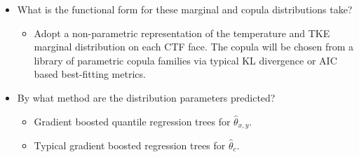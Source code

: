 \documentclass[t, pdftex]{beamer}
\begin{document}
\begin{frame}
{\begin{itemize}
        \item What is the functional form for these marginal and copula distributions take?
        \begin{itemize}
            \item Adopt a non-parametric representation of the temperature and TKE marginal distribution on each CTF face.  The copula will be chosen from a library of parametric copula families via typical KL divergence or AIC based best-fitting metrics.
        \end{itemize}        
        \item By what method are the distribution parameters predicted?
        \begin{itemize}
            \item Gradient boosted quantile regression trees for $\hat \theta_{x,y}$.
            \item Typical gradient boosted regression trees for $\hat \theta_{c}$.
        \end{itemize}
    \end{itemize}
}
\end{frame}

\end{document}
